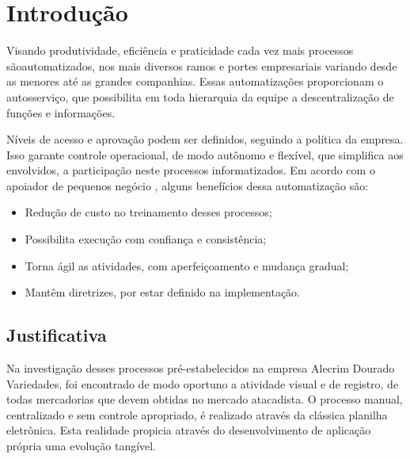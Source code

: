\documentclass[
	12pt,
	openright,
	oneside, %
	a4paper,
	chapter=TITLE,
	section=TITLE,
	english,
	brazil %
	]{abntex2-udesc}
\begin{document}

\ifdraft{}{
}

\ifdraft{}{
}

\tableofcontents*
\cleardoublepage

\textual
\pagestyle{simple}

\chapter{Introdução}

Visando produtividade, eficiência e praticidade cada vez mais processos sãoautomatizados, nos mais diversos ramos e portes empresariais variando desde as menores até as grandes companhias. Essas automatizações proporcionam o autosserviço, que possibilita em toda hierarquia da equipe a descentralização de funções e informações.

Níveis de acesso e aprovação podem ser definidos, seguindo a política da empresa. Isso garante controle operacional, de modo autônomo e flexível, que simplifica aos envolvidos, a participação neste processos informatizados. Em acordo com o apoiador de pequenos negócio , alguns benefícios dessa automatização são:

\begin{itemize}
\item Redução de custo no treinamento desses processos;
\item Possibilita execução com confiança e consistência;
\item Torna ágil as atividades, com aperfeiçoamento e mudança gradual;
\item Mantêm diretrizes, por estar definido na implementação.
\end{itemize}

\section{Justificativa}

Na investigação desses processos pré-estabelecidos na empresa Alecrim Dourado Variedades, foi encontrado de modo oportuno a atividade visual e de registro, de todas mercadorias que devem obtidas no mercado atacadista. O processo manual, centralizado e sem controle apropriado, é realizado através da clássica planilha eletrônica. Esta realidade propicia através do desenvolvimento de aplicação própria uma evolução tangível.
\end{document}
